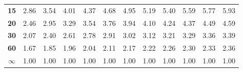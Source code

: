 \begin{center}
\begin{tabular}{c|c|c|c|c|c|c|c|c|c|c|c}
\textbf{15}    & 2.86 & 3.54 & 4.01 & 4.37 & 4.68 & 4.95 & 5.19 & 5.40 & 5.59 & 5.77 & 5.93 \bstrut\tstrut\\
\textbf{20}    & 2.46 & 2.95 & 3.29 & 3.54 & 3.76 & 3.94 & 4.10 & 4.24 & 4.37 & 4.49 & 4.59 \bstrut\tstrut\\
\textbf{30}    & 2.07 & 2.40 & 2.61 & 2.78 & 2.91 & 3.02 & 3.12 & 3.21 & 3.29 & 3.36 & 3.39 \bstrut\tstrut\\
\textbf{60}    & 1.67 & 1.85 & 1.96 & 2.04 & 2.11 & 2.17 & 2.22 & 2.26 & 2.30 & 2.33 & 2.36 \bstrut\tstrut\\
$\infty$      & 1.00 & 1.00 & 1.00 & 1.00 & 1.00 & 1.00 & 1.00 & 1.00 & 1.00 & 1.00 & 1.00 \bstrut\tstrut\\
\hline
\end{tabular}
\end{center}

\clearpage %